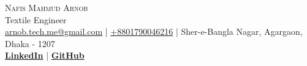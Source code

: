 
\begin{center}
    {\Huge \scshape {Nafis Mahmud Arnob}}\\
    \vspace{2mm}
     {\large Textile Engineer} \\
    \vspace{2mm}
    \href{mailto:arnob.tech.me@gmail.com}{arnob.tech.me@gmail.com} | \href{tel:+8801790046216}{+8801790046216} | Sher-e-Bangla Nagar, Agargaon, Dhaka - 1207\\
    \vspace{1mm}
    \textbf{\href{https://www.linkedin.com/in/arnob-mahmud/}{LinkedIn}} | \textbf{\href{https://www.github.com/ArnobMahmud}{GitHub}}\\
  \end{center}
